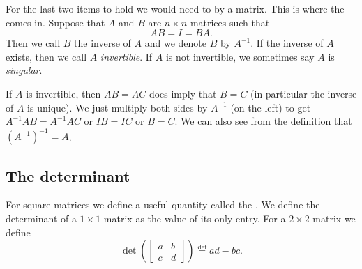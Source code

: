 For the last two items to hold we would need to  by
a matrix.  This is where the \emph{} comes in.
Suppose that $A$ and $B$ are $n \times n$ matrices such that
\begin{equation*}
AB = I = BA .
\end{equation*}
Then we call $B$ the inverse of $A$ and we denote $B$ by $A^{-1}$.
If the inverse of $A$ exists, then we call $A$
\emph{invertible}.
If $A$ is not invertible, we sometimes say $A$ is
\emph{singular}.

If $A$ is invertible, then $AB = AC$ does imply
that $B = C$ (in particular the inverse of $A$ is unique).
We just multiply both sides by $A^{-1}$ (on the left) to get
$A^{-1}AB = A^{-1}AC$ or $IB=IC$ or $B=C$.
We can also see from the definition that ${(A^{-1})}^{-1} = A$.

\subsection{The determinant}

For square matrices we define a useful quantity called the
\emph{}.  We define
the determinant of a $1 \times 1$ matrix as the value of its only entry.
For a $2 \times 2$ matrix we define
\begin{equation*}
\det \left(
\begin{bmatrix}
a & b \\
c & d
\end{bmatrix}
\right)
\overset{\text{def}}{=}
ad-bc .
\end{equation*}

